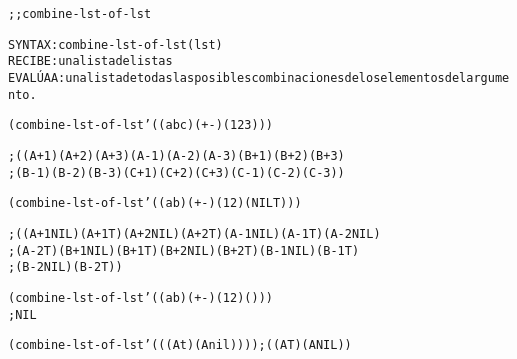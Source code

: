 \begin{aibox}{\function}
\begin{alltt}
;; combine-lst-of-lst

SYNTAX: combine-lst-of-lst (lst)
RECIBE: una lista de listas
EVALÚA A: una lista de todas las posibles combinaciones de los elementos del argumento. 
\end{alltt}
\end{aibox}

\begin{aibox}{\examples}
\begin{alltt}
 (combine-lst-of-lst '((a b c) (+ -) (1 2 3)))

;((A + 1) (A + 2) (A + 3) (A - 1) (A - 2) (A - 3) (B + 1) (B + 2) (B + 3)
; (B - 1) (B - 2) (B - 3) (C + 1) (C + 2) (C + 3) (C - 1) (C - 2) (C - 3))

(combine-lst-of-lst '((a b) (+ -) (1 2) (NIL T)))

; ((A + 1 NIL) (A + 1 T) (A + 2 NIL) (A + 2 T) (A - 1 NIL) (A - 1 T) (A - 2 NIL)
; (A - 2 T) (B + 1 NIL) (B + 1 T) (B + 2 NIL) (B + 2 T) (B - 1 NIL) (B - 1 T)
; (B - 2 NIL) (B - 2 T))

(combine-lst-of-lst '((a b) (+ -) (1 2) ()))
; NIL

(combine-lst-of-lst '(((A t) (A nil)))) ; ((A T) (A NIL))
\end{alltt}

\end{aibox}

